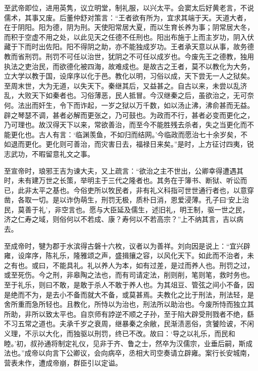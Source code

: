 \documentclass[12pt,UTF8]{ctexbook}
\begin{document}
至武帝即位，进用英隽，议立明堂，制礼服，以兴太平。会窦太后好黄老言，不说儒术，其事又废。后董仲舒对策言：“王者欲有所为，宜求其端于天。天道大者，在于阴阳。阳为德，阴为刑。天使阳常居大夏，而以生育长养为事；阴常居大冬，而积于空虚不用之处，以此见天之任德不任刑也。阳出布施于上而主岁功，阴入伏藏于下而时出佐阳。阳不得阴之助，亦不能独成岁功。王者承天意以从事，故务德教而省刑罚。刑罚不可任以治世，犹阴之不可任以成岁也。今废先王之德教，独用执法之吏治民，而欲德化被四海，故难成也。是故古之王者，莫不以教化为大务，立大学以教于国，设庠序以化于邑。教化以明，习俗以成，天下尝无一人之狱矣。至周末世，大为无道，以失天下。秦继其后，又益甚之。自古以来，未尝以乱济乱，大败天下如秦者也。习俗薄恶，民人抵冒。今汉继秦之后，虽欲治之，无可奈何。法出而奸生，令下而诈起，一岁之狱以万千数，如以汤止沸，沸俞甚而无益。辟之琴瑟不调，甚者必解而更张之，乃可鼓也。为政而不行，甚者必变而更化之，乃可理也。故汉得天下以来，常欲善治，而至今不能胜残去杀者，失之当更化而不能更化也。古人有言：‘临渊羡鱼，不如归而结网。’今临政而愿治七十余岁矣，不如退而更化。更化则可善治，而灾害日去，福禄日来矣。”是时，上方征讨四夷，锐志武功，不暇留意礼文之事。



至宣帝时，琅邪王吉为谏大夫，又上疏言：“欲治之主不世出，公卿幸得遭遇其时，未有建万世之长策，举明主于三代之隆者也。其务在于簿书、断狱、听讼而已，此非太平之基也。今俗吏所以牧民者，非有礼义科指可世世通行者也，以意穿凿，各取一切。是以诈伪萌生，刑罚无极，质朴日消，恩爱浸薄。孔子曰‘安上治民，莫善于礼’，非空言也。愿与大臣延及儒生，述旧礼，明王制，驱一世之民，济之仁寿之域，则俗何以不若成、康？寿何以不若高宗？”上不纳其言，吉以病去。



至成帝时，犍为郡于水滨得古磐十六枚，议者以为善祥。刘向因是说上：“宜兴辟雍，设庠序，陈礼乐，隆雅颂之声，盛揖攘之容，以风化天下。如此而不治者，未之有也。或曰，不能具礼。礼以养人为本，如有过差，是过而养人也。刑罚之过，或至死伤。今之刑，非皋陶之法也，而有司请定法，削则削，笔则笔，救时务也。至于礼乐，则曰不敢，是敢于杀人不敢于养人也。为其俎豆、管弦之间小不备，因是绝而不为，是去小不备而就大不备，或莫甚焉。夫教化之比于刑法，刑法轻，是舍所重而急所轻也。且教化，所恃以为治也，刑法所以助治也。今废所恃而独立其所助，非所以致太平也。自京师有誖逆不顺之子孙，至于陷大辟受刑戮者不绝，繇不习五常之道也。夫承千岁之衰周，继暴秦之余敝，民渐渍恶俗，贪饕险诐，不闲义理，不示以大化，而独驱以刑罚，终已不改。故曰：‘导之以礼乐，而民和睦。’初，叔孙通将制定礼仪，见非于齐、鲁之士，然卒为汉儒宗，业垂后嗣，斯成法也。”成帝以向言下公卿议，会向病卒，丞相大司空奏请立辟雍。案行长安城南，营表未作，遭成帝崩，群臣引以定谥。
\end{document}
